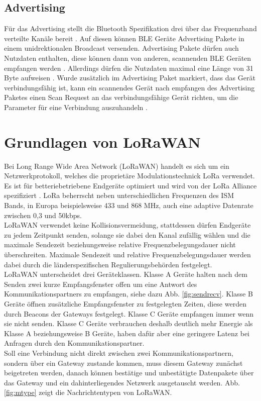 \subsection{Advertising}
Für das Advertising stellt die Bluetooth Spezifikation drei über das Frequenzband verteilte Kanäle bereit \cite{blue2010channel}.
Auf diesen können BLE Geräte Advertising Pakete in einem unidrektionalen Broadcast versenden.
Advertising Pakete dürfen auch Nutzdaten enthalten, diese können dann von anderen, scannenden BLE Geräten empfangen werden \cite{blue2010advertising}.
Allerdings dürfen die Nutzdaten maximal eine Länge von 31 Byte aufweisen \cite{blue2010pdu}.
Wurde zusätzlich im Advertising Paket markiert, dass das Gerät verbindungsfähig ist, kann ein scannendes Gerät nach empfangen des Advertising Paketes einen Scan Request an das verbindungsfähige Gerät richten, um die Parameter für eine Verbindung auszuhandeln \cite{blue2010scanning}.

\section{Grundlagen von LoRaWAN}
Bei Long Range Wide Area Network (LoRaWAN) handelt es sich um ein Netzwerkprotokoll, welches die proprietäre Modulationstechnick LoRa verwendet.
Es ist für betteriebetriebene Endgeräte optimiert und wird von der LoRa Alliance spezifiziert \cite{lora2015spec}.
LoRa beherrscht neben unterschiedlichen Frequenzen des ISM Bands, in Europa beispielsweise 433 und 868 MHz, auch eine adaptive Datenrate zwischen 0,3 und 50kbps.\\
LoRaWAN verwendet keine Kollisionsvermeidung, stattdessen dürfen Endgeräte zu jedem Zeitpunkt senden, solange sie dabei den Kanal zufällig wählen und die maximale Sendezeit beziehungsweise relative Frequenzbelegungsdauer nicht überschreiten.
Maximale Sendezeit und relative Frequenzbelegungsdauer werden dabei durch die länderspezifischen Regulierungsbehörden festgelegt.\\
LoRaWAN unterscheidet drei Geräteklassen.
Klasse A Geräte halten nach dem Senden zwei kurze Empfangsfenster offen um eine Antwort des Kommunikationspartners zu empfangen, siehe dazu Abb. \ref{fig:sendrecv}.
Klasse B Geräte öffnen zusätzliche Empfangsfenster zu festgelegten Zeiten, diese werden durch Beacons der Gateways festgelegt.
Klasse C Geräte empfangen immer wenn sie nicht senden. 
Klasse C Geräte verbrauchen deshalb deutlich mehr Energie als Klasse A beziehungsweise B Geräte, haben dafür aber eine geringere Latenz bei Anfragen durch den Kommunikationspartner.\\
Soll eine Verbindung nicht direkt zwischen zwei Kommunikationspartnern, sondern über ein Gateway zustande kommen, muss diesem Gateway zunächst beigetreten werden, danach können bestätige und unbestätigte Datenpakete über das Gateway und ein dahinterliegendes Netzwerk ausgetauscht werden.
Abb. \ref{fig:mtype} zeigt die Nachrichtentypen von LoRaWAN.

